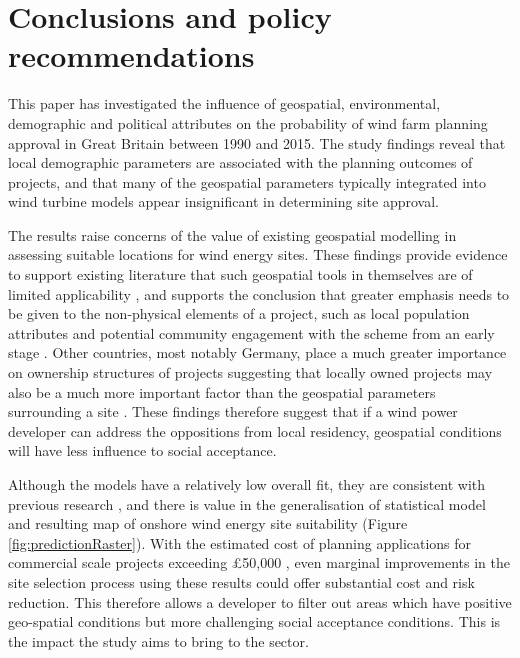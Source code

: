 \documentclass[a4paper,]{article}
\theoremstyle{definition}
\theoremstyle{definition}
\theoremstyle{definition}
\theoremstyle{remark}
\begin{document}
\hypertarget{conclusions-and-policy-recommendations}{%
\section{Conclusions and policy recommendations}\label{conclusions-and-policy-recommendations}}

This paper has investigated the influence of geospatial, environmental, demographic and political attributes on the probability of wind farm planning approval in Great Britain between 1990 and 2015. The study findings reveal that local demographic parameters are associated with the planning outcomes of projects, and that many of the geospatial parameters typically integrated into wind turbine models appear insignificant in determining site approval.

The results raise concerns of the value of existing geospatial modelling in assessing suitable locations for wind energy sites. These findings provide evidence to support existing literature that such geospatial tools in themselves are of limited applicability \citep{Toke2005, Malczewski2004}, and supports the conclusion that greater emphasis needs to be given to the non-physical elements of a project, such as local population attributes and potential community engagement with the scheme from an early stage \citep{Toke2008, Wolsink2000, Warren2010, Roddis2018}. Other countries, most notably Germany, place a much greater importance on ownership structures of projects suggesting that locally owned projects may also be a much more important factor than the geospatial parameters surrounding a site \citep{Warren2010}. These findings therefore suggest that if a wind power developer can address the oppositions from local residency, geospatial conditions will have less influence to social acceptance.

Although the models have a relatively low overall fit, they are consistent with previous research \citep{Roddis2018, VanRensburg20}, and there is value in the generalisation of statistical model and resulting map of onshore wind energy site suitability (Figure \ref{fig:predictionRaster}). With the estimated cost of planning applications for commercial scale projects exceeding £50,000 \citep{RF2016}, even marginal improvements in the site selection process using these results could offer substantial cost and risk reduction. This therefore allows a developer to filter out areas which have positive geo-spatial conditions but more challenging social acceptance conditions. This is the impact the study aims to bring to the sector.
\end{document}
